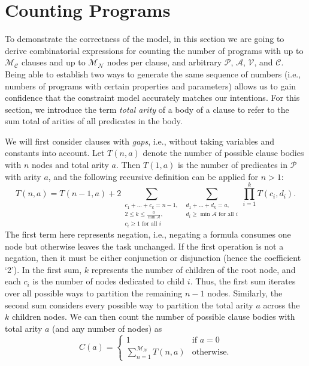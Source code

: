 \documentclass[runningheads]{llncs}
\newcommand{\predicates}{\mathcal{P}}
\newcommand{\variables}{\mathcal{V}}
\newcommand{\constants}{\mathcal{C}}
\newcommand{\arities}{\mathcal{A}}
\newcommand{\maxNumNodes}{\mathcal{M}_{\mathcal{N}}}
\newcommand{\maxNumClauses}{\mathcal{M}_{\mathcal{C}}}
\begin{document}
\section{Counting Programs} \label{sec:counting}

To demonstrate the correctness of the model, in this section we are going to
derive combinatorial expressions for counting the number of programs with up to
$\maxNumClauses{}$ clauses and up to $\maxNumNodes{}$ nodes per clause, and
arbitrary $\predicates{}$, $\arities{}$, $\variables{}$, and $\constants{}$.
Being able to establish two ways to generate the same sequence of numbers (i.e.,
numbers of programs with certain properties and parameters) allows us to gain
confidence that the constraint model accurately matches our intentions. For this
section, we introduce the term \emph{total arity} of a body of a clause to refer
to the sum total of arities of all predicates in the body.

We will first consider clauses with \emph{gaps}, i.e., without taking variables
and constants into account. Let $T(n, a)$ denote the number of possible clause
bodies with $n$ nodes and total arity $a$. Then $T(1, a)$ is the number of
predicates in $\predicates{}$ with arity $a$, and the following recursive
definition can be applied for $n > 1$:
\[
  T(n, a) = T(n-1, a) + 2\sum_{\substack{c_1 + \dots + c_k = n - 1,\\ 2 \le k
      \le \frac{a}{\min \arities{}},\\ c_i \ge 1 \text{ for all } i}}
  \sum_{\substack{d_1 + \dots + d_k = a,\\ d_i \ge \min \arities{} \text{ for
        all } i}} \prod_{i=1}^k T(c_i, d_i).
\]
The first term here represents negation, i.e., negating a formula consumes
one node but otherwise leaves the task unchanged. If the first operation is not
a negation, then it must be either conjunction or disjunction (hence the
coefficient `2'). In the first sum, $k$ represents the number of children of the
root node, and each $c_i$ is the number of nodes dedicated to child $i$. Thus,
the first sum iterates over all possible ways to partition the remaining $n-1$
nodes. Similarly, the second sum considers every possible way to partition the
total arity $a$ across the $k$ children nodes. We can then count the number of
possible clause bodies with total arity $a$ (and any number of nodes) as
\[
  C(a) = \begin{cases}
    1 & \text{if } a = 0\\
    \sum_{n=1}^{\maxNumNodes{}} T(n, a) & \text{otherwise.}
  \end{cases}
\]
\end{document}
